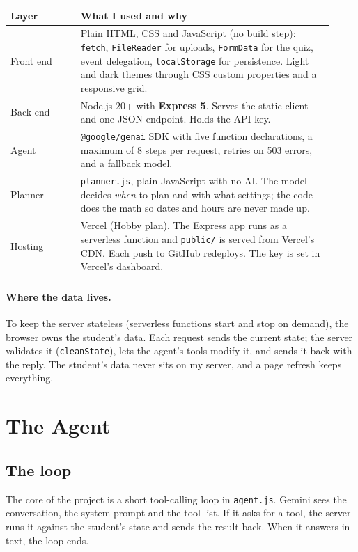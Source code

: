 \documentclass[11pt]{article}
\begin{document}
\begin{center}
\begin{tabular}{@{}p{0.2\linewidth}p{0.72\linewidth}@{}}
\toprule
\textbf{Layer} & \textbf{What I used and why} \\
\midrule
Front end & Plain HTML, CSS and JavaScript (no build step): \texttt{fetch}, \texttt{FileReader}
for uploads, \texttt{FormData} for the quiz, event delegation, \texttt{localStorage} for
persistence. Light and dark themes through CSS custom properties and a responsive grid. \\
Back end & Node.js 20+ with \textbf{Express 5}. Serves the static client and one JSON endpoint.
Holds the API key. \\
Agent & \texttt{@google/genai} SDK with five function declarations, a maximum of 8 steps per
request, retries on 503 errors, and a fallback model. \\
Planner & \texttt{planner.js}, plain JavaScript with no AI. The model decides \emph{when} to plan
and with what settings; the code does the math so dates and hours are never made up. \\
Hosting & Vercel (Hobby plan). The Express app runs as a serverless function and
\texttt{public/} is served from Vercel's CDN. Each push to GitHub redeploys. The key is set
in Vercel's dashboard. \\
\bottomrule
\end{tabular}
\end{center}

\paragraph{Where the data lives.} To keep the server stateless (serverless functions start and
stop on demand), the browser owns the student's data. Each request sends the current state; the server
validates it (\texttt{cleanState}), lets the agent's tools modify it, and sends it back with the
reply. The student's data never sits on my server, and a page refresh keeps everything.

\section{The Agent}
\subsection{The loop}
The core of the project is a short tool-calling loop in \texttt{agent.js}. Gemini sees the
conversation, the system prompt and the tool list. If it asks for a tool, the server runs it
against the student's state and sends the result back. When it answers in text, the loop ends.
\end{document}

